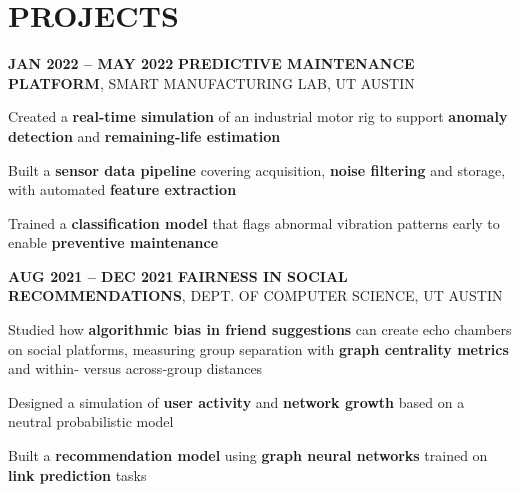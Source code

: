     \section{PROJECTS}
    \begin{twocolentry}{
        \textbf{JAN 2022 -- MAY 2022}
        }
        \textbf{PREDICTIVE MAINTENANCE PLATFORM}, SMART MANUFACTURING LAB, UT AUSTIN
    \end{twocolentry}
    \begin{onecolentry}
        \vspace{0.05 cm}
        \begin{highlights}
            \item Created a \textbf{real-time simulation} of an industrial motor rig to support \textbf{anomaly detection} and \textbf{remaining-life estimation}
            \item Built a \textbf{sensor data pipeline} covering acquisition, \textbf{noise filtering} and storage, with automated \textbf{feature extraction}
            \item Trained a \textbf{classification model} that flags abnormal vibration patterns early to enable \textbf{preventive maintenance}
        \end{highlights}
    \end{onecolentry}
    \vspace{0.2 cm}
    \begin{twocolentry}{
        \textbf{AUG 2021 -- DEC 2021}
        }
        \textbf{FAIRNESS IN SOCIAL RECOMMENDATIONS}, DEPT. OF COMPUTER SCIENCE, UT AUSTIN
    \end{twocolentry}
    \begin{onecolentry}
        \vspace{0.05 cm}
        \begin{highlights}
            \item Studied how \textbf{algorithmic bias in friend suggestions} can create echo chambers on social platforms, measuring group separation with \textbf{graph centrality metrics} and within- versus across-group distances
            \item Designed a simulation of \textbf{user activity} and \textbf{network growth} based on a neutral probabilistic model
            \item Built a \textbf{recommendation model} using \textbf{graph neural networks} trained on \textbf{link prediction} tasks
        \end{highlights}
    \end{onecolentry}
